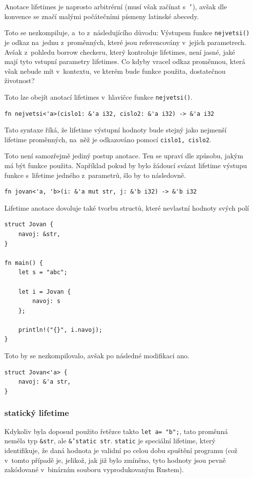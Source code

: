 \documentclass[a4paper, 12pt]{article} %
\newcommand{\rust}[1]{\texttt{#1}}
\begin{document}
            Anotace lifetimes je naprosto arbitrérní (musí však začínat s~\rust{'}), avšak dle konvence se značí malými počátečními písmeny latinské abecedy.
            
            Toto se nezkompiluje, a~to z~následujícího důvodu: Výstupem funkce \rust{nejvetsi()} je odkaz na~jednu z~proměnných, které jsou referencovány v~jejích parametrech. Avšak z~pohledu borrow checkeru, který kontroluje lifetimes, není jasné, jaké mají tyto vstupní parametry lifetimes. Co kdyby vracel odkaz proměnnou, která však nebude mít v~kontextu, ve kterém bude funkce použita, dostatečnou životnost? 
            
            Toto lze obejít anotací lifetimes v~hlavičce funkce \rust{nejvetsi()}.
            \begin{verbatim}
fn nejvetsi<'a>(cislo1: &'a i32, cislo2: &'a i32) -> &'a i32
            \end{verbatim}
            
            Tato syntaxe říká, že lifetime výstupní hodnoty bude stejný jako nejmenší lifetime proměnných, na~něž je odkazováno pomocí \rust{cislo1, cislo2}.
            
            Toto není samozřejmě jediný postup anotace. Ten se upraví dle způsobu, jakým má být funkce použita. Například pokud by bylo žádoucí svázat lifetime výstupu funkce s~lifetime jedného z~parametrů, šlo by to následovně.
            \begin{verbatim}
fn jovan<'a, 'b>(i: &'a mut str, j: &'b i32) -> &'b i32
            \end{verbatim}
            
            Lifetime anotace dovoluje také tvorbu structů, které nevlastní hodnoty svých polí
            \begin{verbatim}
struct Jovan {
    navoj: &str,
}

fn main() {
    let s = "abc";
    
    let i = Jovan {
        navoj: s
    };
    
    println!("{}", i.navoj);
}
            \end{verbatim}
            
            Toto by se nezkompilovalo, avšak po následné modifikaci ano.
            \begin{verbatim}
struct Jovan<'a> {
    navoj: &'a str,
}
            \end{verbatim}
            
            \subsubsection*{statický lifetime}
                Kdykoliv byla doposud použito řetězce takto \rust{let a= "b";}, tato proměnná neměla typ \rust{&str}, ale \rust{&'static str}. \rust{static} je speciální lifetime, který identifikuje, že daná hodnota je validní po celou dobu spuštění programu (což v~tomto případě je, jelikož, jak již bylo zmíněno, tyto hodnoty jsou pevně zakódované v~binárním souboru vyprodukovaným Rustem).
\end{document}

